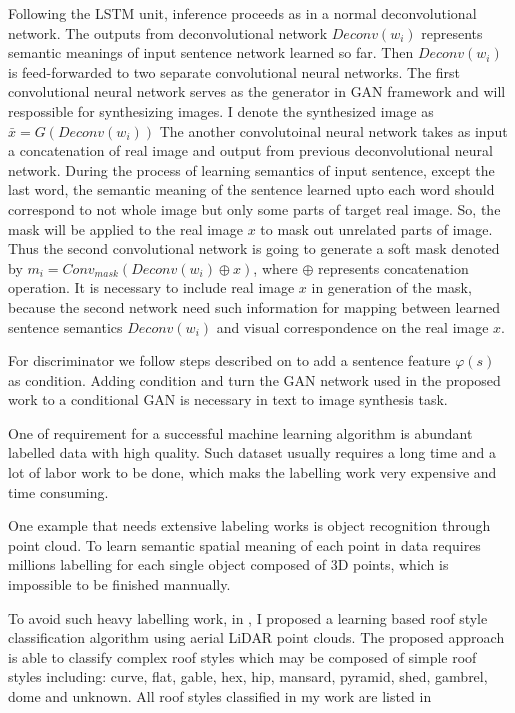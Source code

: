 \documentclass{iitthesis}
\begin{document}
Following the LSTM unit, inference proceeds as in a normal deconvolutional network. The outputs from deconvolutional network $Deconv(w_i)$ represents semantic meanings of input sentence network learned so far. Then $Deconv(w_i)$ is feed-forwarded to two separate convolutional neural networks. The first convolutional neural network serves as the generator in GAN framework and will respossible for synthesizing images. I denote the synthesized image as $\bar{x}=G(Deconv(w_i))$ The another convolutoinal neural network takes as input a concatenation of real image and output from previous deconvolutional neural network. During the process of learning semantics of input sentence, except the last word,  the semantic meaning of the sentence learned upto each word should correspond to not whole image but only some parts of target real image. So, the mask will be applied to the real image $x$ to mask out unrelated parts of image. Thus the second convolutional network is going to generate a soft mask denoted by $m_i = Conv_{mask}(Deconv(w_i)\oplus x)$, where $\oplus$ represents concatenation operation. It is necessary to include real image $x$ in generation of the mask, because the second network need such information for mapping between learned sentence semantics $Deconv(w_i)$ and visual correspondence on the real image $x$. 

For discriminator we follow steps described on \cite{reed2016generative} to add a sentence feature $\varphi(s)$ as condition. Adding condition and turn the GAN network used in the proposed work to a conditional GAN is necessary in text to image synthesis task. 

One of requirement for a successful machine learning algorithm is abundant labelled data with high quality. Such dataset usually requires a long time and a lot of labor work to be done, which maks the labelling work very expensive and time consuming. 

 One example that needs extensive labeling works is object recognition through point cloud. To learn semantic spatial meaning of each point in data requires millions labelling for each single object composed of 3D points, which is impossible to be finished mannually.

To avoid such heavy labelling work, in \cite{ZX:14}, I proposed a learning based roof style classification algorithm using aerial LiDAR point clouds. The proposed approach is able to classify complex roof styles which may be composed of simple roof styles including: curve, flat, gable, hex, hip, mansard, pyramid, shed, gambrel, dome and unknown. All roof styles classified in my work are listed in 
\end{document}
